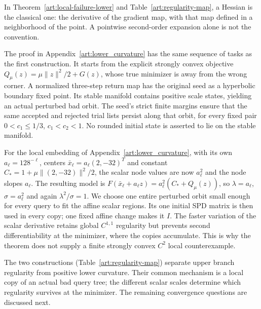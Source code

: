 In Theorem~\ref{art:local-failure-lower} and Table~\ref{art:regularity-map}, a
Hessian is the classical one: the derivative of the gradient map, with that
map defined in a neighborhood of the point. A pointwise second-order
expansion alone is not the convention.

The proof in Appendix~\ref{art:lower_curvature} has the same sequence of
tasks as the first construction. It starts from the explicit strongly convex
objective $Q_\mu(z)=\mu\|z\|^2/2+G(z)$, whose true minimizer is away from
the wrong corner. A normalized three-step return map has the original seed
as a hyperbolic boundary fixed point. Its stable manifold contains positive
scale states, yielding an actual perturbed bad orbit. The seed's strict
finite margins ensure that the same accepted and rejected trial lists
persist along that orbit, for every fixed pair $0<c_1\le1/3$, $c_1<c_2<1$. No rounded initial state is asserted to lie on
the stable manifold.

For the local embedding of Appendix~\ref{art:lower_curvature}, with its own
$a_\ell=128^{-\ell}$, centers $\bar x_\ell=a_\ell(2,-32)^T$ and constant
$C_*=1+\mu\|(2,-32)\|^2/2$, the scalar node values are now $a_\ell^2$ and the
node slopes $a_\ell$. The resulting model is
$F(\bar x_\ell+a_\ell z)=a_\ell^2(C_*+Q_\mu(z))$, so
$\lambda=a_\ell$, $\sigma=a_\ell^2$ and again
$\lambda^2/\sigma=1$. We choose one entire perturbed orbit small enough
for every query to fit the affine scalar regions. Its one initial SPD
matrix is then used in every copy; one fixed affine change makes it $I$.
The faster variation of the scalar derivative retains global $C^{1,1}$
regularity but prevents second differentiability at the minimizer, where the
copies accumulate.
This is why the theorem does not supply a finite strongly convex $C^2$
local counterexample.

The two constructions (Table~\ref{art:regularity-map}) separate upper branch
regularity from positive lower
curvature. Their common mechanism is a local copy of an actual bad query
tree; the different scalar scales determine which regularity survives at
the minimizer. The remaining convergence questions are discussed
next.
